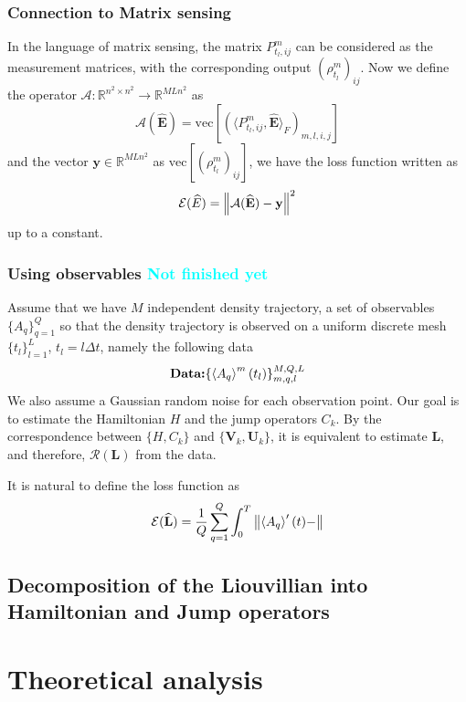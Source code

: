 \documentclass[10pt]{article}  %
\theoremstyle{plain}
\numberwithin{equation}{section}
\newcommand{\innerp}[1]{\langle{#1}\rangle}
\def\mE{\mathcal{E}}
\def\mA{\mathcal{A}}
\def\mR{\mathcal{R}}
\def\R{\mathbb{R}}
\newcommand{\bL}{\mathbf{L}}
\newcommand{\bV}{\mathbf{V}}
\newcommand{\bU}{\mathbf{U}}
\newcommand{\bE}{\mathbf{E}}
\newcommand{\by}{\mathbf{y}}
\renewcommand{\vec}{\text{vec}}
\newcommand{\QL}[1]{\textcolor{cyan}{{#1}}}
\renewcommand{\R}{\mathbb{R}}
\begin{document}
\subsubsection{Connection to Matrix sensing}
In the language of matrix sensing, the matrix $P^m_{t_l, ij}$ can be considered as the measurement matrices, with the corresponding output $(\rho^m_{t_l})_{ij}$. Now we define the operator $\mA : \R^{n^2\times n^2}\to \R^{MLn^2}$ as
\begin{equation}
	\mA(\widehat{\bE}) = \vec\left[(\innerp{P^m_{t_l, ij}, \widehat{\bE}}_F)_{m, l, i, j}\right]
\end{equation}
and the vector $\by\in \R^{MLn^2}$ as $\vec\left[(\rho^m_{t_l})_{ij}\right]$, we have the loss function written as 
\begin{equation}
	\mE(\widehat{E}) = \norm{\mA(\widehat{\bE}) - \by}^2
\end{equation}
up to a constant. 

\subsubsection{Using observables \QL{Not finished yet}}
Assume that we have $M$ independent density trajectory, a set of observables $\{A_q\}_{q = 1}^Q$ so that the density trajectory is observed on a uniform discrete mesh $\{t_l\}_{l = 1}^L$, $t_l = l \Delta t$, namely the following data
\begin{equation}
	\textbf{Data:} \{\expval{A_q}^m (t_l)\}_{m, q, l}^{M, Q, L}
\end{equation}
We also assume a Gaussian random noise for each observation point. Our goal is to estimate the Hamiltonian $H$ and the jump operators $C_k$. By the correspondence between $\{H, C_k\}$ and $\{\bV_k, \bU_k\}$, it is equivalent to estimate $\bL$, and therefore, $\mR(\bL)$ from the data. 

It is natural to define the loss function as 
\begin{equation}
	\mE(\widehat{\bL}) = \frac{1}{Q}\sum_{q = 1}^Q\int_0^T \norm{\expval{A_q}'(t) - }
\end{equation}

\subsection{Decomposition of the Liouvillian into Hamiltonian and Jump operators }


\section{Theoretical analysis}
\end{document}
